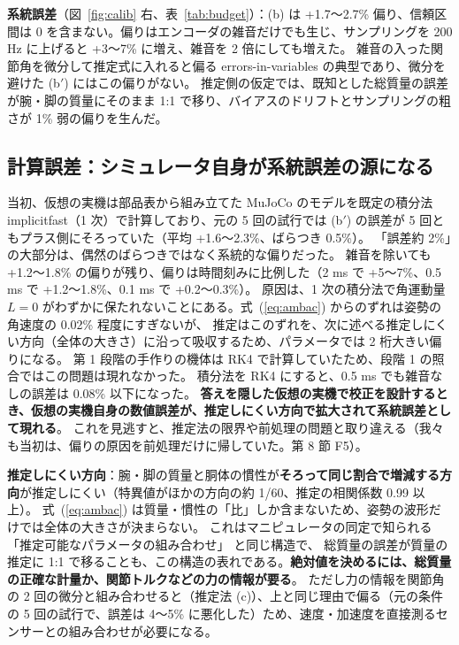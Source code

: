 \documentclass[paper=a4paper,fontsize=10pt,twocolumn,column_gap=2zw,line_length=24zw,number_of_lines=46,head_space=20mm]{jlreq}
\begin{document}
\textbf{系統誤差}（図~\ref{fig:calib} 右、表~\ref{tab:budget}）：(b) は +1.7〜2.7\% 偏り、信頼区間は 0 を含まない。偏りはエンコーダの雑音だけでも生じ、サンプリングを 200 Hz に上げると +3〜7\% に増え、雑音を 2 倍にしても増えた。
雑音の入った関節角を微分して推定式に入れると偏る errors-in-variables の典型であり、微分を避けた (b$'$) にはこの偏りがない。
推定側の仮定では、既知とした総質量の誤差が腕・脚の質量にそのまま 1:1 で移り、バイアスのドリフトとサンプリングの粗さが 1\% 弱の偏りを生んだ。

\subsection{計算誤差：シミュレータ自身が系統誤差の源になる}
当初、仮想の実機は部品表から組み立てた MuJoCo のモデルを既定の積分法 implicitfast（1 次）で計算しており、元の 5 回の試行では (b$'$) の誤差が 5 回ともプラス側にそろっていた（平均 +1.6〜2.3\%、ばらつき 0.5\%）。
「誤差約 2\%」の大部分は、偶然のばらつきではなく系統的な偏りだった。
雑音を除いても +1.2〜1.8\% の偏りが残り、偏りは時間刻みに比例した（2 ms で +5〜7\%、0.5 ms で +1.2〜1.8\%、0.1 ms で +0.2〜0.3\%）。
原因は、1 次の積分法で角運動量 $L=0$ がわずかに保たれないことにある。式~(\ref{eq:ambac}) からのずれは姿勢の角速度の 0.02\% 程度にすぎないが、
推定はこのずれを、次に述べる推定しにくい方向（全体の大きさ）に沿って吸収するため、パラメータでは 2 桁大きい偏りになる。
第 1 段階の手作りの機体は RK4 で計算していたため、段階 1 の照合ではこの問題は現れなかった。
積分法を RK4 にすると、0.5 ms でも雑音なしの誤差は 0.08\% 以下になった。
\textbf{答えを隠した仮想の実機で校正を設計するとき、仮想の実機自身の数値誤差が、推定しにくい方向で拡大されて系統誤差として現れる}。
これを見逃すと、推定法の限界や前処理の問題と取り違える（我々も当初は、偏りの原因を前処理だけに帰していた。第 8 節 F5）。

\textbf{推定しにくい方向}：腕・脚の質量と胴体の慣性が\textbf{そろって同じ割合で増減する方向}が推定しにくい（特異値がほかの方向の約 1/60、推定の相関係数 0.99 以上）。
式~(\ref{eq:ambac}) は質量・慣性の「比」しか含まないため、姿勢の波形だけでは全体の大きさが決まらない。
これはマニピュレータの同定で知られる「推定可能なパラメータの組み合わせ」\cite{gautier1990} と同じ構造で、
総質量の誤差が質量の推定に 1:1 で移ることも、この構造の表れである。\textbf{絶対値を決めるには、総質量の正確な計量か、関節トルクなどの力の情報が要る}。
ただし力の情報を関節角の 2 回の微分と組み合わせると（推定法 (c)）、上と同じ理由で偏る（元の条件の 5 回の試行で、誤差は 4〜5\% に悪化した）ため、速度・加速度を直接測るセンサーとの組み合わせが必要になる。
\end{document}
